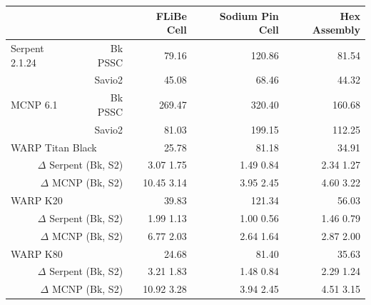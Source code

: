 \documentclass[preprint,12pt]{elsarticle}
\begin{document}
\begin{table}[h]
\smallskip

\begin{tabular}{| l r | r | r | r |}
\cline{3-5}
\multicolumn{2}{c|}{}                            & FLiBe Cell   & Sodium Pin Cell & Hex Assembly  \\
\hline                                    
Serpent 2.1.24   &   Bk PSSC                     & 79.16        & 120.86          & 81.54         \\
                 &   Savio2                      & 45.08        &  68.46          &  44.32        \\
\hline                                        
MCNP 6.1         &   Bk PSSC                     & 269.47       & 320.40          & 160.68        \\
                 &   Savio2                      & 81.03        & 199.15          & 112.25        \\
\hline                       
\multicolumn{2}{|l|}{WARP Titan Black }          &  25.78       & 81.18           & 34.91         \\
\multicolumn{2}{|r|}{$\Delta$ Serpent (Bk, S2)}  &  3.07  1.75  & 1.49  0.84      & 2.34  1.27    \\
\multicolumn{2}{|r|}{$\Delta$ MCNP    (Bk, S2)}  &  10.45 3.14  & 3.95  2.45      & 4.60  3.22    \\
\hline
\multicolumn{2}{|l|}{WARP K20 }                  & 39.83        & 121.34          & 56.03         \\
\multicolumn{2}{|r|}{$\Delta$ Serpent (Bk, S2)}  &  1.99  1.13  & 1.00  0.56      & 1.46  0.79    \\
\multicolumn{2}{|r|}{$\Delta$ MCNP    (Bk, S2)}  &  6.77  2.03  & 2.64  1.64      & 2.87  2.00    \\
\hline
\multicolumn{2}{|l|}{WARP K80   }                & 24.68        & 81.40           & 35.63         \\
\multicolumn{2}{|r|}{$\Delta$ Serpent (Bk, S2)}  & 3.21  1.83   &  1.48  0.84     &  2.29  1.24   \\
\multicolumn{2}{|r|}{$\Delta$ MCNP    (Bk, S2)}  & 10.92 3.28   &  3.94  2.45     &  4.51  3.15   \\
\hline
\end{tabular}
\end{table}
\end{document}
